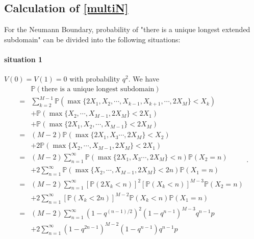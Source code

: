 \documentclass[a4paper,11pt]{article}
\begin{document}
\begin{appendices}
\subsection{Calculation of \eqref{multiN}}\label{appB3}

For the Neumann Boundary, probability of "there is a unique longest extended subdomain" can be divided into the following situations:

\paragraph*{situation 1}
$V(0) = V(1) = 0$ with probability $q^2$. We have
\begin{equation*}
\begin{split}
  & \mathbb{P}(\text{there is a unique longest subdomain}) \\
= & \sum_{k=2}^{M-1} \mathbb{P}(\max\{2 X_1, X_2, \cdots, X_{k-1}, X_{k+1}, \cdots, 2 X_{M}\} < X_k) \\
& + \mathbb{P}(\max\{X_2, \cdots, X_{M-1}, 2 X_M\} < 2 X_1) \\
& + \mathbb{P}(\max\{2 X_1, X_2, \cdots, X_{M-1}\} < 2 X_M) \\
= & (M-2) \mathbb{P}(\max\{2 X_1, X_3 \cdots, 2 X_{M}\} < X_2) \\
& + 2 \mathbb{P}(\max\{X_2, \cdots, X_{M-1}, 2 X_M\} < 2 X_1) \\
= & (M-2) \sum_{n=1}^{\infty} \mathbb{P}(\max\{2 X_1, X_3 \cdots, 2 X_{M}\} < n) \mathbb{P}(X_2 = n) \\
& + 2 \sum_{n=1}^{\infty} \mathbb{P}(\max\{X_2, \cdots, X_{M-1}, 2 X_M\} < 2 n) \mathbb{P}(X_1 = n) \\
= & (M-2) \sum_{n=1}^{\infty} [\mathbb{P}(2 X_k < n)]^2 [\mathbb{P}(X_k < n)]^{M-3} \mathbb{P}(X_2 = n) \\
& + 2 \sum_{n=1}^{\infty} [\mathbb{P}(X_k < 2 n)]^{M-2} \mathbb{P}(X_k < n) \mathbb{P}(X_1 = n) \\
= & (M-2) \sum_{n=1}^{\infty} (1 - q^{(n-1)/2})^2 (1 - q^{n-1})^{M-3} q^{n-1} p \\
& + 2 \sum_{n=1}^{\infty} (1 - q^{2n-1})^{M-2} (1 - q^{n-1}) q^{n-1} p
\end{split}.
\end{equation*}


\end{appendices}
\end{document}
